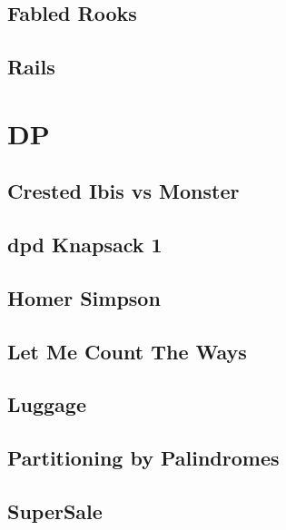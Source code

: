         \subsection{Fabled Rooks}        
                
        \subsection{Rails}        
                

\section{DP}
        \subsection{Crested Ibis vs Monster}
                
        \subsection{dpd Knapsack 1}
                
        \subsection{Homer Simpson}
                
        \subsection{Let Me Count The Ways}
                
        \subsection{Luggage}
                
        \subsection{Partitioning by Palindromes}
                
        \subsection{SuperSale}
                
